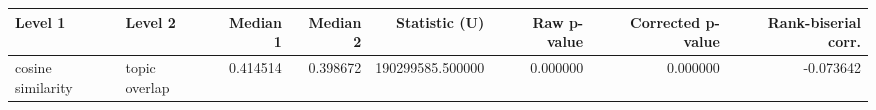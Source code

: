 \begin{tabular}{llrrrrrr}
\toprule
Level 1 & Level 2 & Median 1 & Median 2 & Statistic (U) & Raw p-value & Corrected p-value & Rank-biserial corr. \\
\midrule
cosine similarity & topic overlap & 0.414514 & 0.398672 & 190299585.500000 & 0.000000 & 0.000000 & -0.073642 \\
\bottomrule
\end{tabular}
